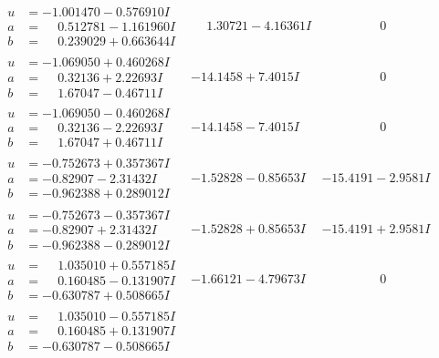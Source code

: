 \documentclass[1p]{elsarticle_modified}
\theoremstyle{definition}
\begin{document}
$$\begin{array}{c|c|c}
 \hline 
\begin{aligned}
u &= -1.001470 - 0.576910 I \\
a &= \phantom{-}0.512781 - 1.161960 I \\
b &= \phantom{-}0.239029 + 0.663644 I\end{aligned}
 & \phantom{-}1.30721 - 4.16361 I & \phantom{-0.000000 } 0 \\ \hline\begin{aligned}
u &= -1.069050 + 0.460268 I \\
a &= \phantom{-}0.32136 + 2.22693 I \\
b &= \phantom{-}1.67047 - 0.46711 I\end{aligned}
 & -14.1458 + 7.4015 I & \phantom{-0.000000 } 0 \\ \hline\begin{aligned}
u &= -1.069050 - 0.460268 I \\
a &= \phantom{-}0.32136 - 2.22693 I \\
b &= \phantom{-}1.67047 + 0.46711 I\end{aligned}
 & -14.1458 - 7.4015 I & \phantom{-0.000000 } 0 \\ \hline\begin{aligned}
u &= -0.752673 + 0.357367 I \\
a &= -0.82907 - 2.31432 I \\
b &= -0.962388 + 0.289012 I\end{aligned}
 & -1.52828 - 0.85653 I & -15.4191 - 2.9581 I \\ \hline\begin{aligned}
u &= -0.752673 - 0.357367 I \\
a &= -0.82907 + 2.31432 I \\
b &= -0.962388 - 0.289012 I\end{aligned}
 & -1.52828 + 0.85653 I & -15.4191 + 2.9581 I \\ \hline\begin{aligned}
u &= \phantom{-}1.035010 + 0.557185 I \\
a &= \phantom{-}0.160485 - 0.131907 I \\
b &= -0.630787 + 0.508665 I\end{aligned}
 & -1.66121 - 4.79673 I & \phantom{-0.000000 } 0 \\ \hline\begin{aligned}
u &= \phantom{-}1.035010 - 0.557185 I \\
a &= \phantom{-}0.160485 + 0.131907 I \\
b &= -0.630787 - 0.508665 I\end{aligned}

\end{array}$$
\end{document}
